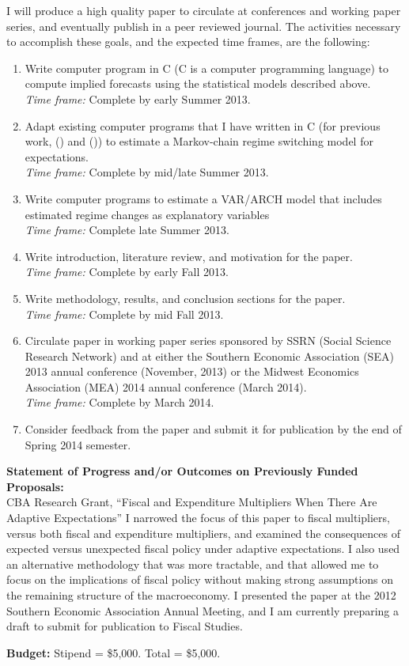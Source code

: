 \documentclass[12pt]{article}
\newcommand{\be}{\begin{enumerate}\setlength{\leftmargin}{0pt}}
\newcommand{\ee}{\end{enumerate}}
\newcommand{\citee}[1]{\citename{#1} (\citeyear{#1})}
\begin{document}
I will produce a high quality paper to circulate at conferences and working paper series, and eventually publish in a peer reviewed journal.  The activities necessary to accomplish these goals, and the expected time frames, are the following:
\be
\item Write computer program in C (C is a computer programming language) to compute implied forecasts using the statistical models described above.\\
\textit{Time frame:} Complete by early Summer 2013.
\item Adapt existing computer programs that I have written in C (for previous work, \citee{murray_regime} and \citee{haupert_murray}) to estimate a Markov-chain regime switching model for expectations.\\
\textit{Time frame:} Complete by mid/late Summer 2013.
\item Write computer programs to estimate a VAR/ARCH model that includes estimated regime changes as explanatory variables\\
\textit{Time frame:} Complete late Summer 2013.
\item Write introduction, literature review, and motivation for the paper.\\
\textit{Time frame:} Complete by early Fall 2013.
\item Write methodology, results, and conclusion sections for the paper.\\
\textit{Time frame:} Complete by mid Fall 2013.
\item Circulate paper in working paper series sponsored by SSRN (Social Science Research Network) and at either the Southern Economic Association (SEA) 2013 annual conference (November, 2013) or the Midwest Economics Association (MEA) 2014 annual conference (March 2014).  \\
\textit{Time frame:} Complete by March 2014.
\item Consider feedback from the paper and submit it for publication by the end of Spring 2014 semester.
\ee

\noindent \textbf{Statement of Progress and/or Outcomes on Previously Funded Proposals:}\\
CBA Research Grant, ``Fiscal and Expenditure Multipliers When There Are Adaptive Expectations''
\noindent I narrowed the focus of this paper to fiscal multipliers, versus both fiscal and expenditure multipliers, and examined the consequences of expected versus unexpected fiscal policy under adaptive expectations.  I also used an alternative methodology that was more tractable, and that allowed me to focus on the implications of fiscal policy without making strong assumptions on the remaining structure of the macroeconomy.  I presented the paper at the 2012 Southern Economic Association Annual Meeting, and I am currently preparing a draft to submit for publication to Fiscal Studies.  

\noindent \textbf{Budget:}  Stipend = \$5,000.  Total = \$5,000.

\vspace*{-0.4in}
\begin{singlespace}


\end{singlespace}
\end{document}
